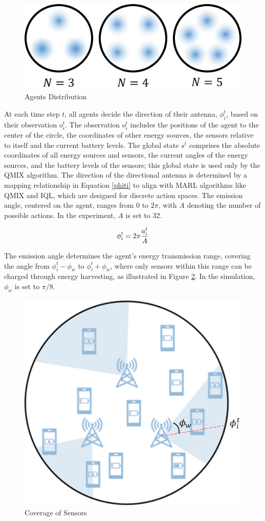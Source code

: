 \documentclass{article}
\begin{document}
\begin{figure}[htb]
	\centerline{\includegraphics{Agent_Distribution.png}}
	\caption{Agents Distribution}\label{Agent_Distribution}
\end{figure}

At each time step $t$, all agents decide the direction of their antenna, $\phi_i^t$, based on their observation $o_i^t$. The observation $o_i^t$ includes the positions of the agent to the center of the circle, the coordinates of other energy sources, the sensors relative to itself and the current battery levels. The global state $s^t$ comprises the absolute coordinates of all energy sources and sensors, the current angles of the energy sources, and the battery levels of the sensors; this global state is used only by the QMIX algorithm. The direction of the directional antenna is determined by a mapping relationship in Equation \ref{phiti} to align with MARL algorithms like QMIX and IQL, which are designed for discrete action spaces. The emission angle, centered on the agent, ranges from $0$ to $2\pi$, with $A$ denoting the number of possible actions. In the experiment, $A$ is set to $32$.

\begin{equation}\label{phiti}
\phi^t_i = 2\pi{a_i^t\over A}
\end{equation}

The emission angle determines the agent's energy transmission range, covering the angle from $\phi_i^t-\phi_w$ to $\phi_i^t+\phi_w$, where only sensors within this range can be charged through energy harvesting, as illustrated in Figure \ref{Coverage}. In the simulation, $\phi_w$ is set to $\pi/8$.

\begin{figure}[htb]
	\centerline{\includegraphics[width=0.4\linewidth]{Coverage.png}}
	\caption{Coverage of Sensors}\label{Coverage}
\end{figure}
\end{document}
